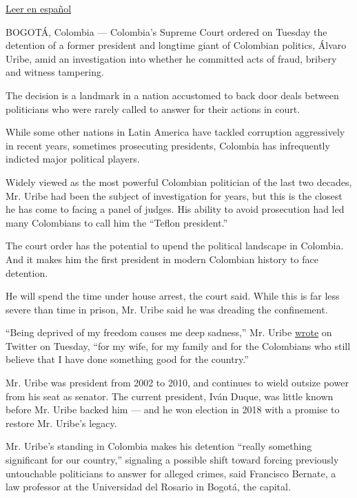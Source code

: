 \href{https://www.nytimes.com/es/2020/08/04/espanol/america-latina/alvaro-uribe-detencion-colombia.html}{Leer
en español}

BOGOTÁ, Colombia --- Colombia's Supreme Court ordered on Tuesday the
detention of a former president and longtime giant of Colombian
politics, Álvaro Uribe, amid an investigation into whether he committed
acts of fraud, bribery and witness tampering.

The decision is a landmark in a nation accustomed to back door deals
between politicians who were rarely called to answer for their actions
in court.

While some other nations in Latin America have tackled corruption
aggressively in recent years, sometimes prosecuting presidents, Colombia
has infrequently indicted major political players.

Widely viewed as the most powerful Colombian politician of the last two
decades, Mr. Uribe had been the subject of investigation for years, but
this is the closest he has come to facing a panel of judges. His ability
to avoid prosecution had led many Colombians to call him the ``Teflon
president.''

The court order has the potential to upend the political landscape in
Colombia. And it makes him the first president in modern Colombian
history to face detention.

He will spend the time under house arrest, the court said. While this is
far less severe than time in prison, Mr. Uribe said he was dreading the
confinement.

``Being deprived of my freedom causes me deep sadness,'' Mr. Uribe
\href{https://twitter.com/AlvaroUribeVel/status/1290712262504779784}{wrote}
on Twitter on Tuesday, ``for my wife, for my family and for the
Colombians who still believe that I have done something good for the
country.''

Mr. Uribe was president from 2002 to 2010, and continues to wield
outsize power from his seat as senator. The current president, Iván
Duque, was little known before Mr. Uribe backed him --- and he won
election in 2018 with a promise to restore Mr. Uribe's legacy.

Mr. Uribe's standing in Colombia makes his detention ``really something
significant for our country,'' signaling a possible shift toward forcing
previously untouchable politicians to answer for alleged crimes, said
Francisco Bernate, a law professor at the Universidad del Rosario in
Bogotá, the capital.

